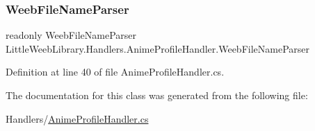 \subsubsection{\texorpdfstring{Weeb\+File\+Name\+Parser}{WeebFileNameParser}}
{\footnotesize\ttfamily readonly Weeb\+File\+Name\+Parser Little\+Weeb\+Library.\+Handlers.\+Anime\+Profile\+Handler.\+Weeb\+File\+Name\+Parser\hspace{0.3cm}{\ttfamily [private]}}



Definition at line 40 of file Anime\+Profile\+Handler.\+cs.



The documentation for this class was generated from the following file\+:\begin{DoxyCompactItemize}
\item 
Handlers/\mbox{\hyperlink{_anime_profile_handler_8cs}{Anime\+Profile\+Handler.\+cs}}\end{DoxyCompactItemize}
